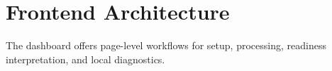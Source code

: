 \section{Frontend Architecture}
The dashboard offers page-level workflows for setup, processing, readiness interpretation, and local diagnostics.

